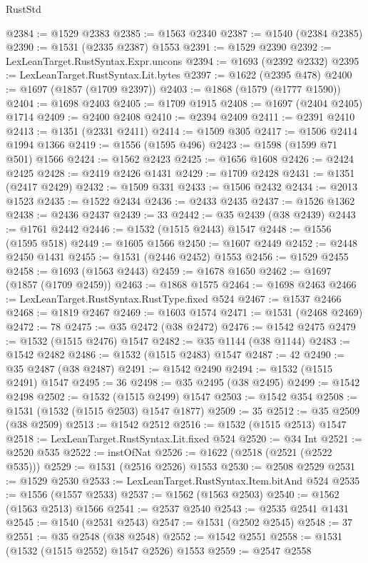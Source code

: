 \begin{lexlean}{RustStd}
\begin{coremodule}
@2384 := @1529 @2383
@2385 := @1563 @2340
@2387 := @1540 (@2384 @2385)
@2390 := @1531 (@2335 @2387) @1553
@2391 := @1529 @2390
@2392 := LexLeanTarget.RustSyntax.Expr.uncons
@2394 := @1693 (@2392 @2332)
@2395 := LexLeanTarget.RustSyntax.Lit.bytes
@2397 := @1622 (@2395 @478)
@2400 := @1697 (@1857 (@1709 @2397))
@2403 := @1868 (@1579 (@1777 @1590))
@2404 := @1698 @2403
@2405 := @1709 @1915
@2408 := @1697 (@2404 @2405) @1714
@2409 := @2400 @2408
@2410 := @2394 @2409
@2411 := @2391 @2410
@2413 := @1351 (@2331 @2411)
@2414 := @1509 @305
@2417 := @1506 @2414 @1994 @1366
@2419 := @1556 (@1595 @496)
@2423 := @1598 (@1599 @71 @501) @1566
@2424 := @1562 @2423
@2425 := @1656 @1608
@2426 := @2424 @2425
@2428 := @2419 @2426 @1431
@2429 := @1709 @2428
@2431 := @1351 (@2417 @2429)
@2432 := @1509 @331
@2433 := @1506 @2432
@2434 := @2013 @1523
@2435 := @1522 @2434
@2436 := @2433 @2435
@2437 := @1526 @1362
@2438 := @2436 @2437
@2439 := 33
@2442 := @35 @2439 (@38 @2439)
@2443 := @1761 @2442
@2446 := @1532 (@1515 @2443) @1547
@2448 := @1556 (@1595 @518)
@2449 := @1605 @1566
@2450 := @1607 @2449
@2452 := @2448 @2450 @1431
@2455 := @1531 (@2446 @2452) @1553
@2456 := @1529 @2455
@2458 := @1693 (@1563 @2443)
@2459 := @1678 @1650
@2462 := @1697 (@1857 (@1709 @2459))
@2463 := @1868 @1575
@2464 := @1698 @2463
@2466 := LexLeanTarget.RustSyntax.RustType.fixed @524
@2467 := @1537 @2466
@2468 := @1819 @2467
@2469 := @1603 @1574
@2471 := @1531 (@2468 @2469)
@2472 := 78
@2475 := @35 @2472 (@38 @2472)
@2476 := @1542 @2475
@2479 := @1532 (@1515 @2476) @1547
@2482 := @35 @1144 (@38 @1144)
@2483 := @1542 @2482
@2486 := @1532 (@1515 @2483) @1547
@2487 := 42
@2490 := @35 @2487 (@38 @2487)
@2491 := @1542 @2490
@2494 := @1532 (@1515 @2491) @1547
@2495 := 36
@2498 := @35 @2495 (@38 @2495)
@2499 := @1542 @2498
@2502 := @1532 (@1515 @2499) @1547
@2503 := @1542 @354
@2508 := @1531 (@1532 (@1515 @2503) @1547 @1877)
@2509 := 35
@2512 := @35 @2509 (@38 @2509)
@2513 := @1542 @2512
@2516 := @1532 (@1515 @2513) @1547
@2518 := LexLeanTarget.RustSyntax.Lit.fixed @524
@2520 := @34 Int
@2521 := @2520 @535
@2522 := instOfNat
@2526 := @1622 (@2518 (@2521 (@2522 @535)))
@2529 := @1531 (@2516 @2526) @1553
@2530 := @2508 @2529
@2531 := @1529 @2530
@2533 := LexLeanTarget.RustSyntax.Item.bitAnd @524
@2535 := @1556 (@1557 @2533)
@2537 := @1562 (@1563 @2503)
@2540 := @1562 (@1563 @2513) @1566
@2541 := @2537 @2540
@2543 := @2535 @2541 @1431
@2545 := @1540 (@2531 @2543)
@2547 := @1531 (@2502 @2545)
@2548 := 37
@2551 := @35 @2548 (@38 @2548)
@2552 := @1542 @2551
@2558 := @1531 (@1532 (@1515 @2552) @1547 @2526) @1553
@2559 := @2547 @2558

\end{coremodule}
\end{lexlean}
